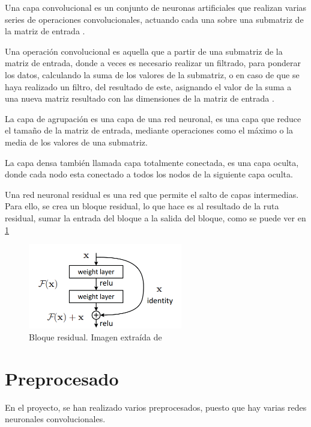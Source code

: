      Una capa convolucional es un conjunto de neuronas artificiales que realizan varias series de operaciones convolucionales, actuando cada una sobre una submatriz de la matriz de entrada \cite{definicionConvolucional_layer}.
     
     Una operación convolucional es aquella que a partir de una submatriz de la matriz de entrada, donde a veces es necesario realizar un filtrado, para ponderar los datos, calculando la suma de los valores de la submatriz, o en caso de que se haya realizado un filtro, del resultado de este, asignando el valor de la suma a una nueva matriz resultado con las dimensiones de la matriz de entrada \cite{definicionConvolutional_Operation}.
     
     La capa de agrupación es una capa de una red neuronal, es una capa que reduce el tamaño de la matriz de entrada, mediante operaciones como el máximo o la media de los valores de una submatriz\cite{definicion_pooling}.

     La capa densa también llamada capa totalmente conectada, es una capa oculta, donde cada nodo esta conectado a todos los nodos de la siguiente capa oculta\cite{definicion_fully_connected_layer}.
     
    Una red neuronal residual es una red que permite el salto de capas intermedias. Para ello, se crea un bloque residual, lo que hace es al resultado de la ruta residual, sumar la entrada del bloque a la salida del bloque, como se puede ver en \ref{fig:residual-block}

\begin{figure}[!ht]
         \centering
         \includegraphics[width=0.6\textwidth]{img/residual-block.png}
         \caption{Bloque residual. Imagen extraída de \cite{DBLP:journals/corr/HeZRS15}}
         \label{fig:residual-block}
\end{figure}
\section{Preprocesado}
En el proyecto, se han realizado varios preprocesados, puesto que hay varias redes neuronales convolucionales.

